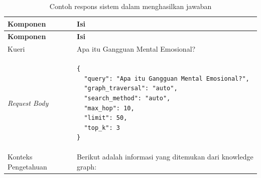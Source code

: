 \begin{longtable}{|p{}|p{}|}
	\caption{Contoh respons sistem dalam menghasilkan jawaban}
	\label{tab:ai-service-response-example}                                                    \\
	\hline
	\textbf{Komponen}            & \textbf{Isi}                                                \\
	\hline \hline
	\endfirsthead

	\hline
	\textbf{Komponen}            & \textbf{Isi}                                                \\
	\hline \hline
	\endhead


	Kueri                        &
	Apa itu Gangguan Mental Emosional?                                                         \\
	\hline
	\textit{Request Body}        & \begin{lstlisting}[basicstyle=\ttfamily\small, numbers=none]
{
  "query": "Apa itu Gangguan Mental Emosional?",
  "graph_traversal": "auto",
  "search_method": "auto",
  "max_hop": 10,
  "limit": 50,
  "top_k": 3
}
    \end{lstlisting} \\
	\hline
	Konteks \newline Pengetahuan &
	Berikut adalah informasi yang ditemukan dari knowledge graph:


\end{longtable}
